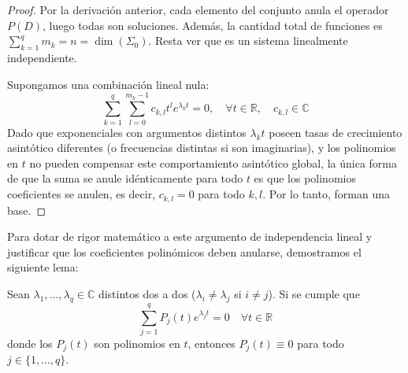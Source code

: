 \begin{proof}
    Por la derivación anterior, cada elemento del conjunto anula el operador $P(D)$, luego todas son soluciones. Además, la cantidad total de funciones es $\sum_{k=1}^q m_k = n = \dim(\Sigma_0)$. Resta ver que es un sistema linealmente independiente.
    
    Supongamos una combinación lineal nula:
    \[
        \sum_{k=1}^q \sum_{l=0}^{m_k - 1} c_{k,l} t^l e^{\lambda_k t} = 0, \quad \forall t \in \mathbb{R}, \quad c_{k,l} \in \mathbb{C}
    \]
    Dado que exponenciales con argumentos distintos $\lambda_k t$ poseen tasas de crecimiento asintótico diferentes (o frecuencias distintas si son imaginarias), y los polinomios en $t$ no pueden compensar este comportamiento asintótico global, la única forma de que la suma se anule idénticamente para todo $t$ es que los polinomios coeficientes se anulen, es decir, $c_{k,l} = 0$ para todo $k, l$. Por lo tanto, forman una base.
\end{proof}

Para dotar de rigor matemático a este argumento de independencia lineal y justificar que los coeficientes polinómicos deben anularse, demostramos el siguiente lema:

\begin{lema}
 Sean $\lambda_1, \dots, \lambda_q \in \mathbb{C}$ distintos dos a dos ($\lambda_i \neq \lambda_j$ si $i \neq j$). Si se cumple que
 \[
 \sum_{j=1}^q P_j(t) e^{\lambda_j t} = 0 \quad \forall t \in \mathbb{R}
 \]
 donde los $P_j(t)$ son polinomios en $t$, entonces $P_j(t) \equiv 0$ para todo $j \in \{1, \dots, q\}$.
\end{lema}

